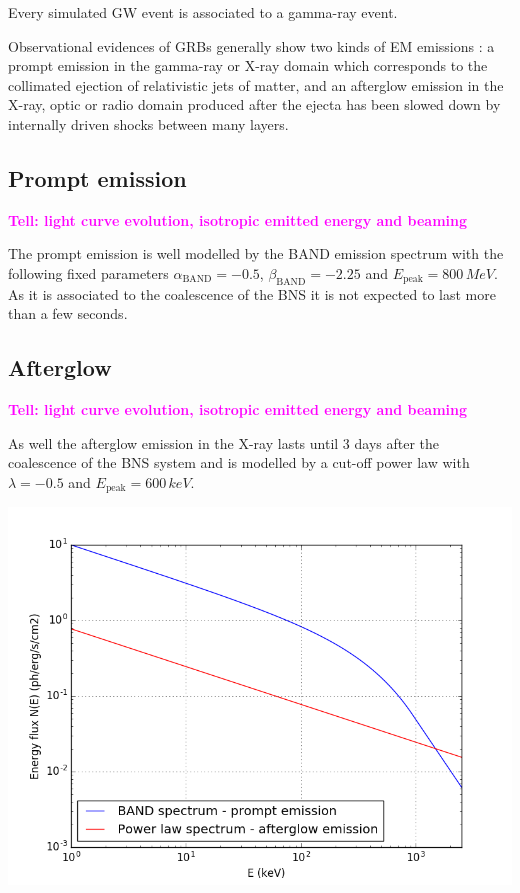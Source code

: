 \documentclass[a0,portrait]{a0poster}
\newcommand{\ECM}[1] {\textbf{\textcolor{magenta}{#1}}}
\begin{document}
\begin{multicols}{2}
Every simulated GW event is associated to a gamma-ray event.

Observational evidences of GRBs generally show two kinds of EM emissions : a
prompt emission in the gamma-ray or X-ray domain which corresponds to the
collimated ejection of relativistic jets of matter, and an afterglow emission in
the X-ray, optic or radio domain produced after the ejecta has been slowed down
by internally driven shocks between many layers.

\subsection*{Prompt emission}

\ECM{Tell: light curve evolution, isotropic emitted energy and beaming}

The prompt emission is well modelled by the BAND emission spectrum with the
following fixed parameters $\alpha_{\mathrm{BAND}} = - 0.5$,
$\beta_{\mathrm{BAND}} = - 2.25$ and $E_{\mathrm{peak}} = 800 \, MeV$. As it is
associated to the coalescence of the BNS it is not expected to last more than a
few seconds. 

\subsection*{Afterglow}

\ECM{Tell: light curve evolution, isotropic emitted energy and beaming}

As well the afterglow emission in the X-ray lasts until 3 days after the
coalescence of the BNS system and is modelled by a cut-off power law with
$\lambda = - 0.5$ and $E_{\mathrm{peak}} = 600 \, keV$. 


\begin{center}\vspace{.5cm}
    \includegraphics[width=20cm]{figures/spectra.png}
    \label{spectra}
\end{center}


\end{multicols}
\end{document}
